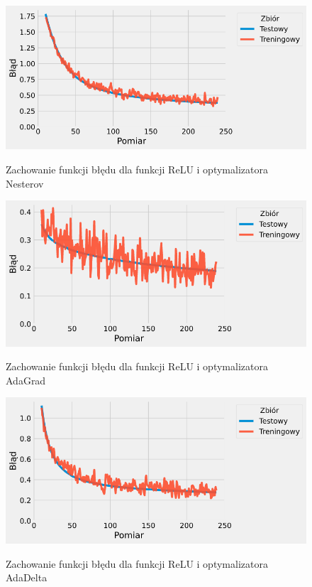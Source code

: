 \documentclass{article}
\begin{document}
\begin{figure}[H]
	\centering
	\caption{Zachowanie funkcji błędu dla funkcji ReLU i optymalizatora Nesterov}
	\includegraphics[width=\textwidth]{sig_nes_err.png}
	\label{fig:res113}
\end{figure}
\begin{figure}[H]
	\centering
	\caption{Zachowanie funkcji błędu dla funkcji ReLU i optymalizatora AdaGrad}
	\includegraphics[width=\textwidth]{sig_grad_err.png}
	\label{fig:res114}
\end{figure}
\begin{figure}[H]
	\centering
	\caption{Zachowanie funkcji błędu dla funkcji ReLU i optymalizatora AdaDelta}
	\includegraphics[width=\textwidth]{sig_delta_err.png}
	\label{fig:res115}
\end{figure}
\end{document}
